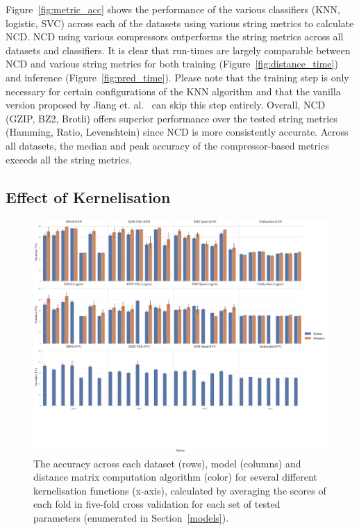 \documentclass[preprint,12pt]{elsarticle}
\begin{document}
Figure~\ref{fig:metric_acc} shows the performance of the various classifiers (KNN, logistic, SVC) across each of the datasets using various string metrics to calculate NCD. 
NCD using various compressors outperforms the string metrics across all datasets and classifiers. 
It is clear that run-times are largely comparable between NCD and various string metrics for both training (Figure~\ref{fig:distance_time}) and inference (Figure~\ref{fig:pred_time}). 
Please note that the training step is only necessary for certain configurations of the KNN algorithm and that the vanilla version proposed by Jiang et. al.~\cite{jiang2022less} can skip this step entirely. 
Overall, NCD (GZIP, BZ2, Brotli) offers superior performance over the tested string metrics (Hamming, Ratio, Levenshtein) since NCD is more consistently accurate. Across all datasets, the median and peak accuracy of the compressor-based metrics exceeds all the string metrics.



\subsection{Effect of Kernelisation}

\begin{figure}
    \centering
    \includegraphics[width=\textwidth]{images/accuracy_vs_kernel.pdf}
    \caption{The accuracy across each dataset (rows), model (columns) and distance matrix computation algorithm (color) for several different kernelisation functions (x-axis), calculated by averaging the scores of each fold in five-fold cross validation for each set of tested parameters (enumerated in Section~\ref{models}).}
    \label{fig:kernel_acc}
\end{figure}
\end{document}
